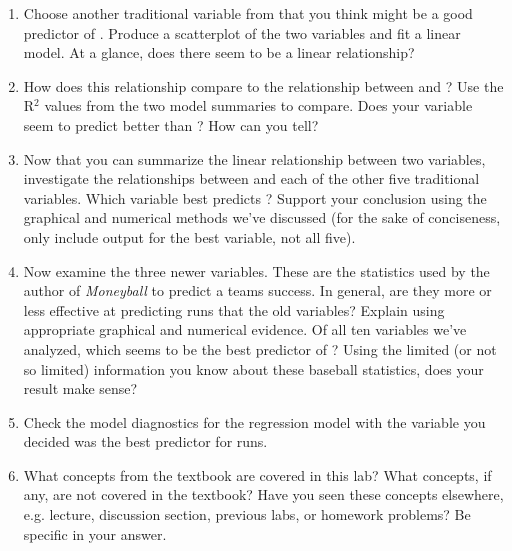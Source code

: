 \documentclass[11pt]{article}
\begin{document}
\begin{enumerate}
\item Choose another traditional variable from \texttt{} that you think might be a good predictor of \texttt{}. Produce a scatterplot of the two variables and fit a linear model.  At a glance, does there seem to be a linear relationship?

\item How does this relationship compare to the relationship between \texttt{} and \texttt{}? Use the R$^2$ values from the two model summaries to compare.  Does your variable seem to predict \texttt{} better than \texttt{}?  How can you tell?

\item Now that you can summarize the linear relationship between two variables, investigate the relationships between \texttt{} and each of the other five traditional variables. Which variable best predicts \texttt{}? Support your conclusion using the graphical and numerical methods we've discussed (for the sake of conciseness, only include output for the best variable, not all five).

\item Now examine the three newer variables.  These are the statistics used by the author of \emph{Moneyball} to predict a teams success.  In general, are they more or less effective at predicting runs that the old variables?  Explain using appropriate graphical and numerical evidence.  Of all ten variables we've analyzed, which seems to be the best predictor of \texttt{}?  Using the limited (or not so limited) information you know about these baseball statistics, does your result make sense?

\item Check the model diagnostics for the regression model with the variable you decided was the best predictor for runs.

\item What concepts from the textbook are covered in this lab? What concepts, if any, are not covered in the textbook? Have you seen these concepts elsewhere, e.g. lecture, discussion section, previous labs, or homework problems? Be specific in your answer.

\end{enumerate}
\end{document}
